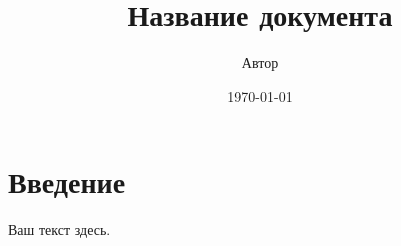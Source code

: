 \documentclass[a4paper,12pt]{article}
\title{Название документа}
\author{Автор}
\date{\today}
\begin{document}
\maketitle

\section{Введение}

Ваш текст здесь.
\end{document}
